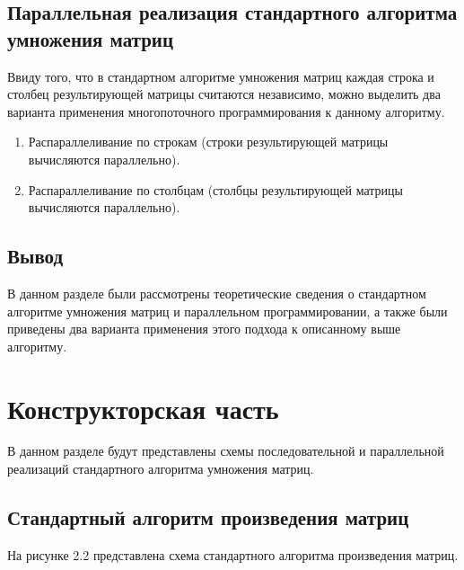 \documentclass[12pt]{report}
\begin{document}
\section{Параллельная реализация стандартного алгоритма умножения матриц}

Ввиду того, что в стандартном алгоритме умножения матриц каждая строка и столбец результирующей матрицы считаются независимо, можно выделить два варианта применения многопоточного программирования к данному алгоритму.
\begin{enumerate}
\item Распараллеливание по строкам (строки результирующей матрицы вычисляются параллельно).
\item  Распараллеливание по столбцам (столбцы результирующей матрицы вычисляются параллельно).
\end{enumerate}

\section{Вывод}

В данном разделе были рассмотрены теоретические сведения о стандартном алгоритме умножения матриц и параллельном программировании, а также были приведены два варианта применения этого подхода к описанному выше алгоритму.
 
\chapter{Конструкторская часть}

В данном разделе будут представлены схемы последовательной и параллельной реализаций стандартного алгоритма умножения матриц.

\section{Стандартный алгоритм произведения матриц}

На рисунке 2.2 представлена схема стандартного алгоритма произведения матриц.
\end{document}
